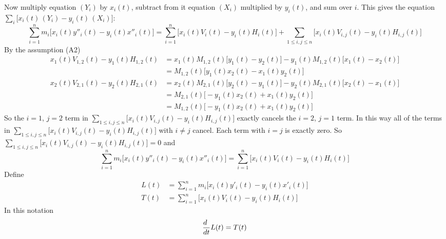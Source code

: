 Now multiply equation $(Y_i)$ by $x_i(t)$, subtract from it
equation $(X_i)$ multiplied by $y_i(t)$, and sum over $i$.
This gives the equation ${\sum_i\big[x_i(t)\,(Y_i)-y_i(t)\,(X_i)\big]}$:
\begin{equation*}
\sum_{i=1}^n m_i\big[x_i(t)y''_i(t)-y_i(t)x''_i(t)\big]
= \sum_{i=1}^n \big[x_i(t)V_i(t)-y_i(t)H_i(t)\big]
+\sum_{1\le i,j\le n} \big[x_i(t)V_{i,j}(t)-y_i(t)H_{i,j}(t)\big]
\end{equation*}
By the assumption (A2)
\begin{align*}
x_1(t)V_{1,2}(t)-y_1(t)H_{1,2}(t)
&=x_1(t)M_{1,2}(t)\big[y_1(t)-y_2(t)\big]
-y_1(t)M_{1,2}(t)\big[x_1(t)-x_2(t)\big]\\
&=M_{1,2}(t)\big[y_1(t)x_2(t)-x_1(t)y_2(t)\big]\\
x_2(t)V_{2,1}(t)-y_2(t)H_{2,1}(t)
&=x_2(t)M_{2,1}(t)\big[y_2(t)-y_1(t)\big]
-y_2(t)M_{2,1}(t)\big[x_2(t)-x_1(t)\big]\\
&=M_{2,1}(t)\big[-y_1(t)x_2(t)+x_1(t)y_2(t)\big]\\
&=M_{1,2}(t)\big[-y_1(t)x_2(t)+x_1(t)y_2(t)\big]
\end{align*}
So the $i=1$, $j=2$ term in $\sum_{1\le i,j\le n}
\big[x_i(t)V_{i,j}(t)-y_i(t)H_{i,j}(t)\big]$
exactly cancels the $i=2$, $j=1$ term.
In this way all of the terms in $\sum_{1\le i,j\le n}
\big[x_i(t)V_{i,j}(t)-y_i(t)H_{i,j}(t)\big]$
with $i\ne j$ cancel. Each term with $i=j$ is exactly zero.
So $\sum_{1\le i,j\le n} \big[x_i(t)V_{i,j}(t)-y_i(t)H_{i,j}(t)\big]=0$
and
\begin{equation*}
\sum_{i=1}^n m_i\big[x_i(t)y''_i(t)-y_i(t)x''_i(t)\big]
= \sum_{i=1}^n \big[x_i(t)V_i(t)-y_i(t)H_i(t)\big]
\end{equation*}
Define
\begin{align*}
L(t)&= \sum_{i=1}^n m_i\big[x_i(t)y'_i(t)-y_i(t)x'_i(t)\big]\\
T(t)&=\sum_{i=1}^n \big[x_i(t)V_i(t)-y_i(t)H_i(t)\big]
\end{align*}
In this notation
\begin{equation}\label{eq:TRQrotmoteqn}
\frac{d\hfill}{dt}L(t)=T(t)
\end{equation}
